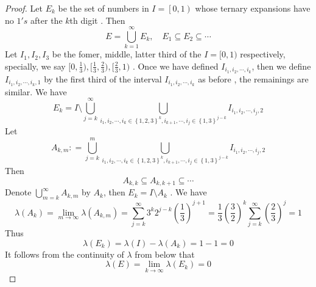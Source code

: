 \documentclass[../main.tex]{subfiles}
\begin{document}
\begin{proof}
    Let \(  E_{k}  \) be the set of numbers in \( I=  \left[ 0,1 \right)  \) whose ternary expansions have no \(  1's  \)   after the \(  k  \)th digit . Then \[
    E= \bigcup _{k = 1}^{\infty}E_{k},\quad E_1\subseteq E_2\subseteq \cdots 
    \] Let \(  I_{1},I_2,I_3  \) be the fomer, middle, latter third of the \( I= [0,1)  \) respectively, specially, we say \(  [0,\frac{1}{3}), [\frac{1}{3},\frac{2}{3}), [\frac{2}{3},1)  \) . Once we have defined \(  I_{i_1,i_2,\cdots ,i_{k}}  \), then we define \(  I_{i_1,i_2,\cdots ,i_{k},1}  \) by the first third of the interval \(  I_{i_1,i_2,\cdots ,i_{k}}  \) as before , the remainings are similar.   We have \[
    E_{k}= I\setminus \bigcup _{j= k}^{\infty} \bigcup _{i_1,i_2,\cdots ,i_{k}\in \left\{ 1,2,3 \right\}^{k},i_{k+ 1},\cdots ,i_{j}\in \left\{ 1,3 \right\}^{j-k}}I_{i_1,i_2,\cdots ,i_{j},2}
    \]Let \[
    A_{k,m}: = \bigcup _{j= k}^{m}  \bigcup _{i_1,i_2,\cdots ,i_{k}\in \left\{ 1,2,3 \right\}^{k},i_{k+ 1},\cdots ,i_{j}\in \left\{ 1,3 \right\}^{j-k}}I_{i_1,i_2,\cdots ,i_{j},2}
    \] Then \[
    A_{k,k}\subseteq A_{k,k + 1}\subseteq \cdots 
    \]Denote \(  \bigcup _{m = k}^{\infty}A_{k,m}  \) by \(  A_{k}  \), then \(  E_{k}= I\setminus A  _{k}\)  . We have \[
     \lambda \left( A_{k} \right)= \lim_{m\to \infty} \lambda \left( A_{k,m} \right)= \sum _{j = k}^{\infty}3^{k} 2^{j-k}\left( \frac{1 }{3 }  \right)^{j + 1}=\frac{1 }{3 }  \left( \frac{3 }{2 }  \right)^{k}\sum _{j = k}^{\infty}  \left( \frac{2 }{3 }  \right)^{j} = 1
    \]Thus \[
     \lambda \left( E_{k} \right)= \lambda \left( I \right)-   \lambda \left( A_{k} \right)= 1-1= 0  
    \] It follows from the continuity of \(   \lambda   \) from below that \[
     \lambda \left( E \right)=  \lim_{k\to \infty} \lambda \left( E_{k} \right)= 0
    \]  
\end{proof}
\end{document}
